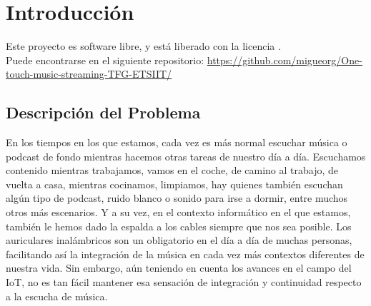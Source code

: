 \chapter{Introducción}

Este proyecto es software libre, y está liberado con la licencia \cite{gplv3}.\\

Puede encontrarse en el siguiente repositorio: \url{https://github.com/migueorg/One-touch-music-streaming-TFG-ETSIIT/}

\section{Descripción del Problema}
En los tiempos en los que estamos, cada vez es más normal escuchar música o podcast de fondo mientras hacemos otras tareas de nuestro día a día. Escuchamos contenido mientras trabajamos, vamos en el coche, de camino al trabajo, de vuelta a casa, mientras cocinamos, limpiamos, hay quienes también escuchan algún tipo de podcast, ruido blanco o sonido para irse a dormir, entre muchos otros más escenarios. Y a su vez, en el contexto informático en el que estamos, también le hemos dado la espalda a los cables siempre que nos sea posible. Los auriculares inalámbricos son un obligatorio en el día a día de muchas personas, facilitando así la integración de la música en cada vez más contextos diferentes de nuestra vida. Sin embargo, aún teniendo en cuenta los avances en el campo del IoT, no es tan fácil mantener esa sensación de integración y continuidad respecto a la escucha de música.\\

